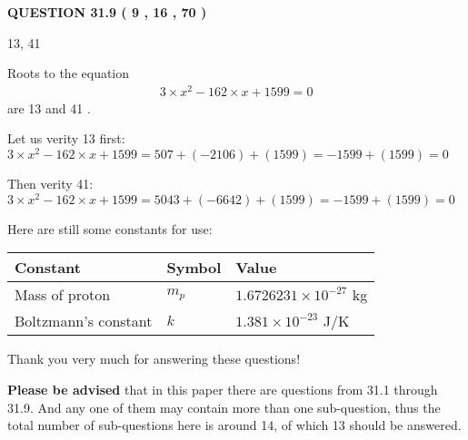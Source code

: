 \documentclass[12pt]{article}
\begin{document}
 
 
  
\vspace{0.2in}
  
{\textbf{\Large{QUESTION
31.9 
 (           9 ,          16 ,          70 )
}}}
  
  


 
 
\noindent{}

13,  %
41
 
 
 
 
 
\noindent{}

Roots to the equation
\begin{eqnarray*}
3 \times x^2  %
-162
                 \times x    %
+  %
1599 =0
\end{eqnarray*}
are  %
13 and  %
41 .
 
Let us verity  %
13 first:
$  %
3 \times x^2  %
-162
                 \times x    %
+  %
1599
  = %
507+( %
-2106)+( %
1599)
  = %
-1599+( %
1599)
  = %
0
$
 
Then verity  %
41:
$  %
3 \times x^2  %
-162
                 \times x    %
+  %
1599
  = %
5043+( %
-6642)+( %
1599)
  = %
-1599+( %
1599)
  = %
0
$
 
 
 
   
   
 \vspace{0.2in}
Here are still some constants for use:
 
 
\noindent\begin{tabular}{|l|l|l|}
\hline
Constant & Symbol & Value \\
\hline
 
Mass of proton &
$m_p$ &
 $ 1.6726231 \times 10^{-27} $
kg \\
\hline
 
Boltzmann's constant &
$k$ &
 $ 1.381 \times 10^{-23} $
J/K \\
\hline
 
\end{tabular}
 
Thank you very much for answering these questions!
 
{\textbf{\large{Please be advised}}} that in this paper there are questions from
31.1 through
31.9.
And any one of them may contain more than one sub-question, thus the total number
of sub-questions here is around 14, of which
13 should be answered.
 
\end{document}

